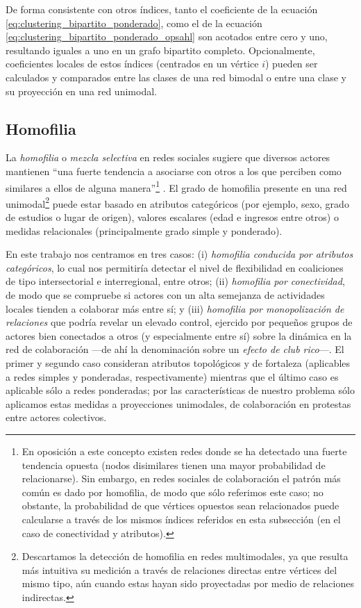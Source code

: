 \documentclass[letterpaper, 11pt]{book}
\theoremstyle{definition}
\theoremstyle{remark}
\begin{document}
De forma consistente con otros índices, tanto el coeficiente de la ecuación \ref{eq:clustering_bipartito_ponderado}, como el de la  ecuación \ref{eq:clustering_bipartito_ponderado_opsahl} son acotados entre cero y uno, resultando iguales a uno en un grafo bipartito completo. 
Opcionalmente, coeficientes locales de estos índices (centrados en un vértice $i$) pueden ser calculados y comparados entre las clases de una red bimodal o entre una clase y su proyección en una red unimodal. 




\subsection{Homofilia}
\label{subsec:Homofilia}
La \emph{homofilia} o \emph{mezcla selectiva} en redes sociales sugiere que diversos actores mantienen ``una fuerte tendencia a asociarse con otros a los que perciben como similares a ellos de alguna manera''\footnote{
    En oposición a este concepto existen redes donde se ha detectado una fuerte tendencia opuesta (nodos disimilares tienen una mayor probabilidad de relacionarse). 
    Sin embargo, en redes sociales de colaboración el patrón más común es dado por homofilia, de modo que sólo referimos este caso; no obstante, la probabilidad de que vértices opuestos sean relacionados puede calcularse a través de los mismos índices referidos en esta subsección (en el caso de conectividad y atributos). 
} \citep[384]{2010_Newman_Networks}. 
El grado de homofilia presente en una red unimodal\footnote{
    Descartamos la detección de homofilia en redes multimodales, ya que resulta más intuitiva su medición a través de relaciones directas entre vértices del mismo tipo, aún cuando estas hayan sido proyectadas por medio de relaciones indirectas. 
} 
puede estar basado en atributos categóricos (por ejemplo, sexo, grado de estudios o lugar de origen), valores escalares (edad e ingresos entre otros) o medidas relacionales (principalmente grado simple y ponderado). 



En este trabajo nos centramos en tres casos: 
(i) \emph{homofilia conducida por atributos categóricos}, lo cual nos permitiría detectar el nivel de flexibilidad en coaliciones de tipo intersectorial e interregional, entre otros; 
(ii) \emph{homofilia por conectividad}, de modo que se compruebe si actores con un alta semejanza de actividades locales tienden a colaborar más entre sí; 
y (iii) \emph{homofilia por monopolización de relaciones} que podría revelar un elevado control, ejercido por pequeños grupos de actores bien conectados a otros (y especialmente entre sí) sobre la dinámica en la red de colaboración ---de ahí la denominación sobre un \emph{efecto de club rico}---. 
El primer y segundo caso consideran atributos topológicos y de fortaleza (aplicables a redes simples y ponderadas, respectivamente) mientras que el último caso es aplicable sólo a redes ponderadas; por las características de nuestro problema sólo aplicamos estas medidas a proyecciones unimodales, de colaboración en protestas entre actores colectivos.
\end{document}

